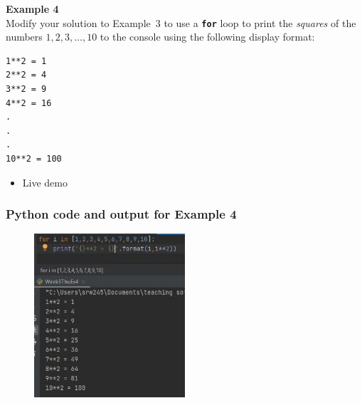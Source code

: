 \documentclass[english,14pt]{beamer}
\newcommand\red[1]{{\color{red} #1}}
\begin{document}

\begin{frame}[fragile]

\frametitle{}

\textbf{Example 4}\\
\vspace*{5mm}
Modify your solution to Example~3 to use a \textbf{\texttt{for}} loop to print the \red{\emph{squares}} of the numbers $1, 2, 3, \ldots, 10$ to the console using the following display format:
\begin{verbatim}
1**2 = 1
2**2 = 4
3**2 = 9
4**2 = 16
.
.
.
10**2 = 100
\end{verbatim}

\begin{itemize}
	\item Live demo
\end{itemize}
	
\end{frame}


\begin{frame}[fragile]

\frametitle{Python code and output for Example 4}

\begin{figure}[ht]
	\centering
	\includegraphics[width=0.5\textwidth]{figures/Week3ThuEx4}
\end{figure}

\end{frame}

\end{document}
